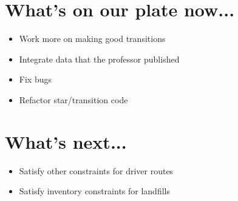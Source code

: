\documentclass{article}
\begin{document}
\section{What's on our plate now...}
\begin{itemize}
  \item Work more on making good transitions
  \item Integrate data that the professor published
  \item Fix bugs
  \item Refactor star/transition code
\end{itemize}
\section{What's next...}
\begin{itemize}
  \item Satisfy other constraints for driver routes
  \item Satisfy inventory constraints for landfills
\end{itemize}
\end{document}
